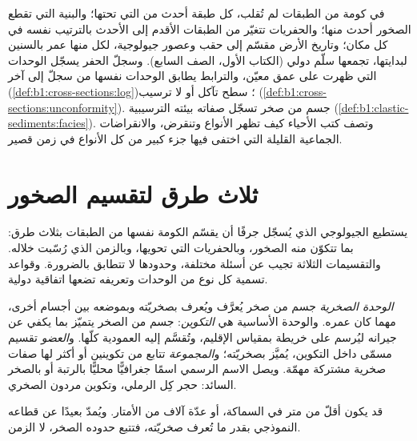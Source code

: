 \begin{recall}
في كومة من الطبقات لم تُقلب، كل طبقة أحدث من التي تحتها؛ والبنية التي تقطع الصخور أحدث منها؛ والحفريات تتغيّر من الطبقات الأقدم إلى الأحدث بالترتيب نفسه في كل مكان؛ وتاريخ الأرض مقسّم إلى حقب وعصور جيولوجية، لكل منها عمر بالسنين لبدايتها، تجمعها سلّم دولي (الكتاب الأول، الصف السابع). وسجلّ الحفر يسجّل الوحدات التي ظهرت على عمق معيّن، والترابط يطابق الوحدات نفسها من سجلّ إلى آخر (\cref{def:b1:cross-sections:log})؛  سطح تآكل أو لا ترسيب (\cref{def:b1:cross-sections:unconformity}).  جسم من صخر تسجّل صفاته بيئته الترسيبية (\cref{def:b1:clastic-sediments:facies}). وتصف كتب الأحياء كيف تظهر الأنواع وتنقرض، والانقراضات الجماعية القليلة التي اختفى فيها جزء كبير من كل الأنواع في زمن قصير.
\end{recall}

\section{ثلاث طرق لتقسيم الصخور}\label{sec:b1:stratigraphic-scale:three}

يستطيع الجيولوجي الذي يُسجّل جرفًا أن يقسّم الكومة نفسها من الطبقات بثلاث طرق: بما تتكوّن منه الصخور، وبالحفريات التي تحويها، وبالزمن الذي رُسّبت خلاله. والتقسيمات الثلاثة تجيب عن أسئلة مختلفة، وحدودها لا تتطابق بالضرورة. وقواعد تسمية كل نوع من الوحدات وتعريفه تضعها اتفاقية دولية.

\begin{definition}\label{def:b1:stratigraphic-scale:lithostratigraphy}
\emph{الوحدة الصخرية} جسم من صخر يُعرَّف ويُعرف بصخريّته وبموضعه بين أجسام أخرى، مهما كان عمره. والوحدة الأساسية هي \emph{التكوين}: جسم من الصخر يتميّز بما يكفي عن جيرانه ليُرسم على خريطة بمقياس الإقليم، وتُقسَّم إليه العمودية كلّها. و\emph{العضو} تقسيم مسمّى داخل التكوين، يُميَّز بصخريّته؛ و\emph{المجموعة} تتابع من تكوينين أو أكثر لها صفات صخرية مشتركة مهمّة. ويصل الاسم الرسمي اسمًا جغرافيًّا محليًّا بالرتبة أو بالصخر السائد: حجر كِل الرملي، وتكوين مردون الصخري.
\end{definition}

قد يكون  أقلّ من متر في السماكة، أو عدّة آلاف من الأمتار. ويُمدّ بعيدًا عن قطاعه النموذجي بقدر ما تُعرف صخريّته، فتتبع حدوده الصخر، لا الزمن.


